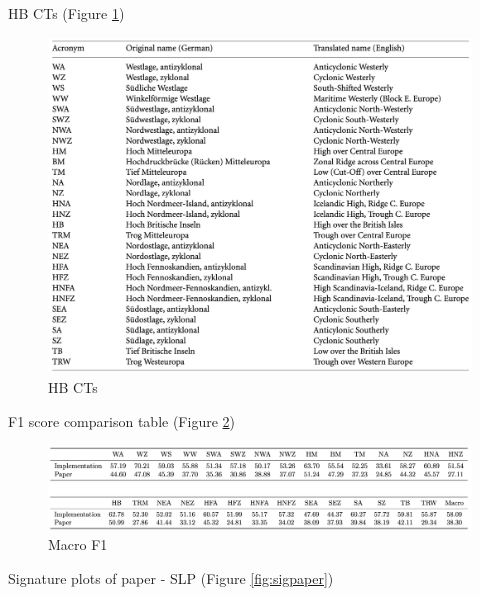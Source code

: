 \documentclass[
]{krantz}
\begin{document}
HB CTs (Figure \ref{fig:cts})

\begin{figure}

{\centering \includegraphics[width=0.7\linewidth]{work/01-weatherpattern/figures/paper/cts} 

}

\caption{HB CTs}\label{fig:cts}
\end{figure}

F1 score comparison table (Figure \ref{fig:f1score})

\begin{figure}

{\centering \includegraphics[width=0.7\linewidth]{work/01-weatherpattern/figures/f1} 

}

\caption{Macro F1}\label{fig:f1score}
\end{figure}

Signature plots of paper - SLP (Figure \ref{fig:sigpaper}) \citep{Mittermeier2022}
\end{document}

